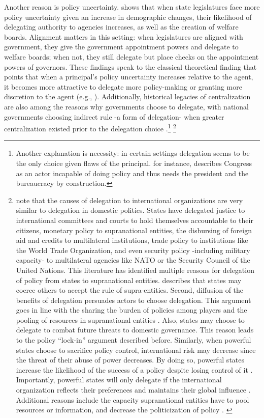 \documentclass[12pt]{amsart}
\numberwithin{equation}{section}
\theoremstyle{definition}
\theoremstyle{definition}
\theoremstyle{definition}
\begin{document}
 Another reason is policy uncertainty. \citet{volden_2002} shows that when state legislatures face more policy uncertainty given an increase in demographic changes, their likelihood of delegating authority to agencies increases, as well as the creation of welfare boards. Alignment matters in this setting: when legislatures are aligned with government, they give the government appointment powers and delegate to welfare boards; when not, they still delegate but place checks on the appointment powers of governors. These findings speak to the classical theoretical finding that points that when a principal's policy uncertainty increases relative to the agent, it becomes more attractive to delegate more policy-making or granting more discretion to the agent (e.g., \citet{epstein_halloran_1994, epstein_halloran_1999, bawn_1995}). Additionally, historical legacies of centralization are also among the reasons why governments choose to delegate, with national governments choosing indirect rule -a form of delegation- when greater centralization existed prior to the delegation choice \citep{gerring_etal_2011}.\footnote{Another explanation is necessity: in certain settings delegation seems to be the only choice given flaws of the principal. \citet{huntington_1995} for instance, describes Congress as an actor incapable of doing policy and thus needs the president and the bureaucracy by construction.} \footnote{\citet{Hawkins_etal_2006} note that the causes of delegation to international organizations are very similar to delegation in domestic politics. States have delegated justice to international committees and courts to hold themselves accountable to their citizens, monetary policy to supranational entities, the disbursing of foreign aid and credits to multilateral institutions, trade policy to institutions like the World Trade Organization, and even security policy -including military capacity- to multilateral agencies like NATO or the Security Council of the United Nations. This literature has identified multiple reasons for delegation of policy from states to supranational entities. \citet{Moravcsik_2000} describes that states may coerce others to accept the rule of supra-entities. Second, diffusion of the benefits of delegation persuades actors to choose delegation. This argument goes in line with the sharing the burden of policies among players and the pooling of resources in supranational entities \citep{milner_2011}. Also, states may choose to delegate to combat future threats to domestic governance. This reason leads to the policy ``lock-in'' argument described before. Similarly, when powerful states choose to sacrifice policy control, international risk may decrease since the threat of their abuse of power decreases. By doing so, powerful states increase the likelihood of the success of a policy despite losing control of it \citep{lake_2009, milner_2011}. Importantly, powerful states will only delegate if the international organization reflects their preferences and maintains their global influence \citep{Hawkins_etal_2006}. Additional reasons include the capacity supranational entities have to pool resources or information, and decrease the politicization of policy \citet{Rodrick_1996}. \label{footnote:international_delegation}}
\end{document}
